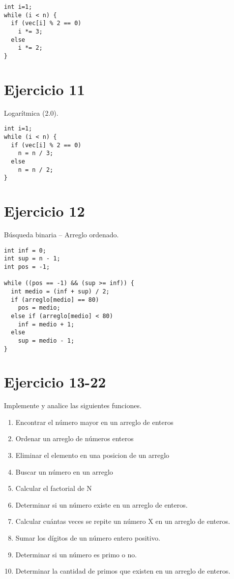 \documentclass{article}
\begin{document}
\begin{lstlisting}
int i=1;
while (i < n) {
  if (vec[i] % 2 == 0)
  	i *= 3;
  else
  	i *= 2;
}
\end{lstlisting}

\section{Ejercicio 11}
Logarítmica (2.0).

\begin{lstlisting}
int i=1;
while (i < n) {
  if (vec[i] % 2 == 0)
  	n = n / 3;
  else
  	n = n / 2;
}
\end{lstlisting}

\pagebreak
\section{Ejercicio 12}
Búsqueda binaria – Arreglo ordenado.

\begin{lstlisting}
int inf = 0;
int sup = n - 1;
int pos = -1;

while ((pos == -1) && (sup >= inf)) {
  int medio = (inf + sup) / 2;
  if (arreglo[medio] == 80)
  	pos = medio;
  else if (arreglo[medio] < 80)
  	inf = medio + 1;
  else
  	sup = medio - 1;
}
\end{lstlisting}

\section{Ejercicio 13-22}
Implemente y analice las siguientes funciones.
\begin{enumerate}
\item Encontrar el número mayor en un arreglo de enteros
\item Ordenar un arreglo de números enteros
\item Eliminar el elemento en una posicion de un arreglo
\item Buscar un número en un arreglo
\item Calcular el factorial de N
\item Determinar si un número existe en un arreglo de enteros.
\item Calcular cuántas veces se repite un número X en un arreglo de enteros.
\item Sumar los dígitos de un número entero positivo.
\item Determinar si un número es primo o no.
\item Determinar la cantidad de primos que existen en un arreglo de enteros.
\end{enumerate}
\end{document}
